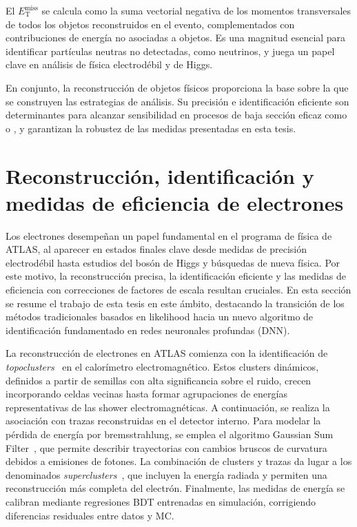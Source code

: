 El $E_{\mathrm{T}}^{\text{miss}}$ se calcula como la suma vectorial negativa de los momentos transversales de todos los objetos reconstruidos en el evento, complementados con contribuciones de energía no asociadas a objetos. Es una magnitud esencial para identificar partículas neutras no detectadas, como neutrinos, y juega un papel clave en análisis de física electrodébil y de Higgs.  

En conjunto, la reconstrucción de objetos físicos proporciona la base sobre la que se construyen las estrategias de análisis. Su precisión e identificación eficiente son determinantes para alcanzar sensibilidad en procesos de baja sección eficaz como \ttH o \thqb, y garantizan la robustez de las medidas presentadas en esta tesis.

\section*{Reconstrucción, identificación y medidas de eficiencia de electrones}

Los electrones desempeñan un papel fundamental en el programa de física de ATLAS, al aparecer en estados finales clave desde medidas de precisión electrodébil hasta estudios del bosón de Higgs y búsquedas de nueva física. Por este motivo, la reconstrucción precisa, la identificación eficiente y las medidas de eficiencia con correcciones de factores de escala resultan cruciales. En esta sección se resume el trabajo de esta tesis en este ámbito, destacando la transición de los métodos tradicionales basados en likelihood hacia un nuevo algoritmo de identificación fundamentado en redes neuronales profundas (DNN). 

La reconstrucción de electrones en ATLAS comienza con la identificación de \textit{topoclusters}~\cite{dyn_clust} en el calorímetro electromagnético. Estos clusters dinámicos, definidos a partir de semillas con alta significancia sobre el ruido, crecen incorporando celdas vecinas hasta formar agrupaciones de energías representativas de las shower electromagnéticas. A continuación, se realiza la asociación con trazas reconstruidas en el detector interno. Para modelar la pérdida de energía por bremsstrahlung, se emplea el algoritmo Gaussian Sum Filter~\cite{FRUHWIRTH1987444}, que permite describir trayectorias con cambios bruscos de curvatura debidos a emisiones de fotones. La combinación de clusters y trazas da lugar a los denominados \textit{superclusters}~\cite{Aad:2684552}, que incluyen la energía radiada y permiten una reconstrucción más completa del electrón. Finalmente, las medidas de energía se calibran mediante regresiones BDT entrenadas en simulación, corrigiendo diferencias residuales entre datos y MC.  

